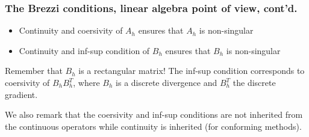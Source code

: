 \begin{frame}
 \frametitle{The Brezzi conditions, linear algebra point of view, cont'd. }
 \begin{itemize}
 \item Continuity and coersivity of $A_h$ ensures that $A_h$ is non-singular 
 \item Continuity and inf-sup condition of $B_h$ ensures that $B_h$ is non-singular 
 \end{itemize}
Remember that $B_h$ is a rectangular matrix! The inf-sup condition corresponds to 
coersivity of  $B_h B_h^T$, where $B_h$ is a discrete divergence and $B_h^T$ the
discrete gradient.    

\vspace{0.3cm}
We also remark that the coersivity and inf-sup conditions are not inherited from 
the continuous operators while continuity is inherited (for conforming methods). 
\end{frame}

